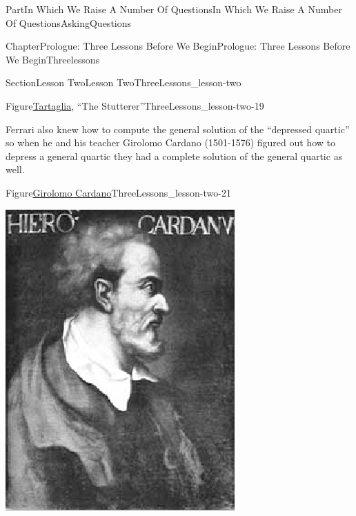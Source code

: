 \documentclass[oneside,10pt,]{book}
\numberwithin{equation}{part}
\begin{document}
\begin{partptx}{Part}{In Which We Raise A Number Of Questions}{}{In Which We Raise A Number Of Questions}{}{}{AskingQuestions}
\begin{chapterptx}{Chapter}{Prologue: Three Lessons Before We Begin}{}{Prologue: Three Lessons Before We Begin}{}{}{Threelessons}
\begin{sectionptx}{Section}{Lesson Two}{}{Lesson Two}{}{}{ThreeLessons_lesson-two}
\begin{figureptx}{Figure}{\href{https://mathshistory.st-andrews.ac.uk/Biographies/Tartaglia/}{Tartaglia}\protect\footnotemark{}, ``The Stutterer''}{ThreeLessons_lesson-two-19}{}
\begin{image}{0.36}{0.28}{0.36}{}
\end{image}%
\tcblower
\end{figureptx}%
%
Ferrari also knew how to compute the general solution of the ``depressed quartic'' so when he and his teacher Girolomo Cardano (1501-1576) figured out how to depress a general quartic they had a complete solution of the general quartic as well.%
\begin{figureptx}{Figure}{\href{https://mathshistory.st-andrews.ac.uk/Biographies/Cardan}{Girolomo Cardano}\protect\footnotemark{}}{ThreeLessons_lesson-two-21}{}%
%
\begin{image}{0.36}{0.28}{0.36}{}%
\includegraphics[width=\linewidth]{external/images/Cardan.png}
\end{image}%
\tcblower
\end{figureptx}%
%

\end{sectionptx}
\end{chapterptx}
\end{partptx}
\end{document}
